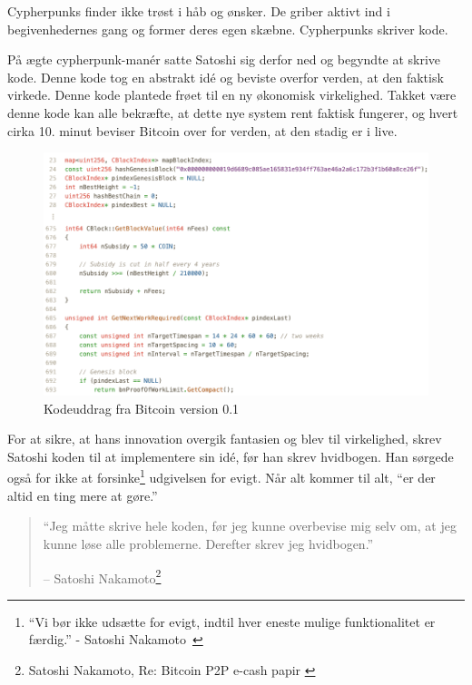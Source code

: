 \documentclass[paper=6in:9in,pagesize=pdftex,headinclude=on,footinclude=on,12pt]{scrbook}
\begin{document}
Cypherpunks finder ikke trøst i håb og ønsker. De griber aktivt ind i begivenhedernes gang og former deres egen skæbne. Cypherpunks skriver kode.

På ægte cypherpunk-man\'er satte Satoshi sig derfor ned og begyndte at skrive kode. Denne kode tog en abstrakt id\'e og beviste overfor verden, at den faktisk virkede. Denne kode plantede frøet til en ny økonomisk virkelighed. Takket være denne kode kan alle bekræfte, at dette nye system rent faktisk fungerer, og hvert cirka 10. minut beviser Bitcoin over for verden, at den stadig er i live.\begin{figure}
  \includegraphics{assets/images/bitcoin-code-white.png}
  \caption{Kodeuddrag fra Bitcoin version 0.1}
  \label{fig:bitcoin-code-white}
\end{figure}

For at sikre, at hans innovation overgik fantasien og blev til virkelighed, skrev Satoshi koden til at implementere sin id\'e, før han skrev hvidbogen. Han sørgede også for ikke at forsinke\footnote{\enquote{Vi bør ikke udsætte for evigt, indtil hver eneste mulige funktionalitet er færdig.} - Satoshi Nakamoto~\cite{satoshi-delay}} udgivelsen for evigt. Når alt kommer til alt, \enquote{er der altid en ting mere at gøre.}\begin{quotation}\begin{samepage} \enquote{Jeg måtte skrive hele koden, før jeg kunne overbevise mig selv om, at jeg kunne løse alle problemerne. Derefter skrev jeg hvidbogen.} \begin{flushright} -- Satoshi Nakamoto\footnote{Satoshi Nakamoto, Re: Bitcoin P2P e-cash papir \cite{satoshi-mail-code-first}}
\end{flushright}\end{samepage}\end{quotation}
\end{document}
